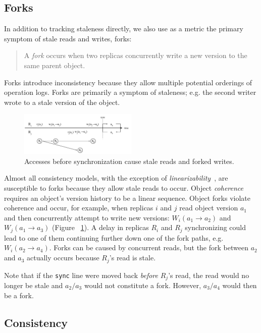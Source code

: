 \documentclass[10pt,conference,letterpaper]{IEEEtran}
\begin{document}
\subsection{Forks}

In addition to tracking staleness directly, we also use as a metric the primary symptom of stale
reads and writes, forks:
\begin{quote}
    A \emph{fork} occurs when two replicas concurrently write a new version to the same parent object.
\end{quote}
Forks introduce inconsistency because they allow multiple potential orderings of operation
logs.
Forks are primarily a symptom of staleness; e.g. the second writer wrote to
a stale version of the object.

\begin{figure}[t]
    \centering
    \includegraphics[width=0.5\textwidth]{figures/forks}
    \caption{Accesses before synchronization cause stale reads and forked writes.}
    \label{fig:forks}
\end{figure}

Almost all consistency models, with the exception of
\textit{linearizability}~\cite{herlihy_linearizability:_1990}, are susceptible to forks
because they allow stale reads to occur.
Object \emph{coherence} requires an object's version history to be a linear sequence.
Object forks violate coherence and occur, for example, when replicas $i$ and $j$ read object version $a_1$
and then concurrently attempt to write new versions: $W_i(a_1 \rightarrow a_2)$ and
$W_j(a_1 \rightarrow a_3)$ (Figure ~\ref{fig:forks}).
A delay in replicas $R_i$ and $R_j$ synchronizing could lead to one of them continuing
further down one of the fork paths, e.g. $W_i(a_2 \rightarrow a_4)$.
Forks can be caused by concurrent reads, but the fork between $a_2$ and $a_3$
actually occurs because $R_j$'s read is stale.

Note that if the \texttt{sync} line were moved back \emph{before} $R_j$'s read,
the read would no longer be stale and $a_2/a_3$ would not constitute a
fork. However,  $a_3/a_4$ would then be a fork.

\subsection{Consistency}
\end{document}
